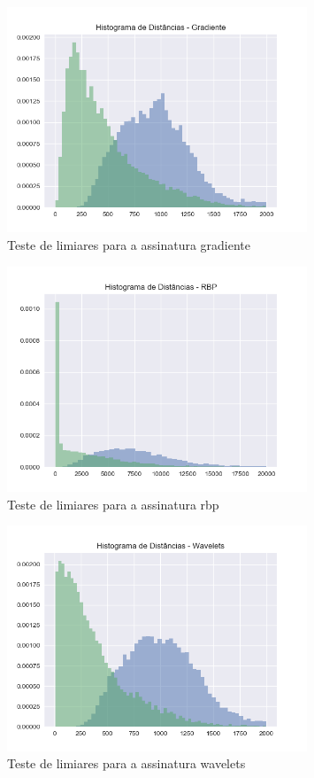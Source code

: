 \begin{figure}[h]
	\centering
	\label{fig:limiares-gradiente}
	\caption{Teste de limiares para a assinatura gradiente}
	\includegraphics[width=0.8\textwidth]{dados/figuras/experimentos/histograma_Gradiente.png}
\end{figure}
\begin{figure}[h]
	\centering
	\label{fig:limiares-rbp}
	\caption{Teste de limiares para a assinatura rbp}
	\includegraphics[width=0.8\textwidth]{dados/figuras/experimentos/histograma_RBP.png}
\end{figure}
\begin{figure}[h]
	\centering
	\label{fig:limiares-wavelets}
	\caption{Teste de limiares para a assinatura wavelets}
	\includegraphics[width=0.8\textwidth]{dados/figuras/experimentos/histograma_Wavelets.png}
\end{figure}

